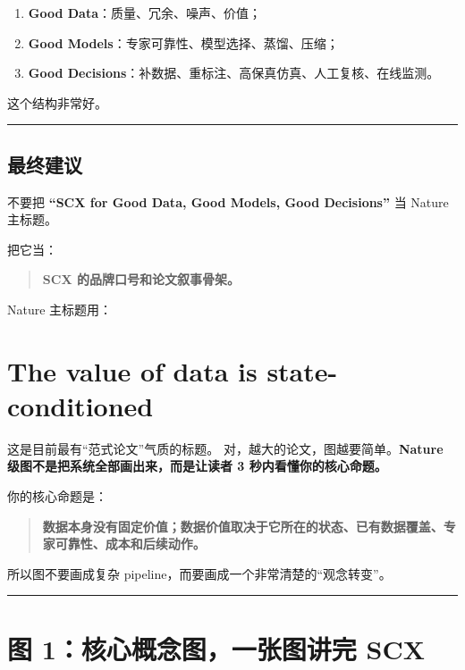 \documentclass[
  12pt,
]{ctexart}
\providecommand{\tightlist}{%
  \setlength{\itemsep}{0pt}\setlength{\parskip}{0pt}}
\begin{document}
\begin{enumerate}
\def\labelenumi{\arabic{enumi}.}
\tightlist
\item
  \textbf{Good Data}：质量、冗余、噪声、价值；
\item
  \textbf{Good Models}：专家可靠性、模型选择、蒸馏、压缩；
\item
  \textbf{Good
  Decisions}：补数据、重标注、高保真仿真、人工复核、在线监测。
\end{enumerate}

这个结构非常好。

\begin{center}\rule{0.5\linewidth}{0.5pt}\end{center}

\subsection{最终建议}\label{ux6700ux7ec8ux5efaux8bae-2}

不要把 \textbf{``SCX for Good Data, Good Models, Good Decisions''} 当
Nature 主标题。

把它当：

\begin{quote}
\textbf{SCX 的品牌口号和论文叙事骨架。}
\end{quote}

Nature 主标题用：

\section{\texorpdfstring{\textbf{The value of data is
state-conditioned}}{The value of data is state-conditioned}}\label{the-value-of-data-is-state-conditioned-1}

这是目前最有``范式论文''气质的标题。
对，越大的论文，图越要简单。\textbf{Nature
级图不是把系统全部画出来，而是让读者 3 秒内看懂你的核心命题。}

你的核心命题是：

\begin{quote}
\textbf{数据本身没有固定价值；数据价值取决于它所在的状态、已有数据覆盖、专家可靠性、成本和后续动作。}
\end{quote}

所以图不要画成复杂 pipeline，而要画成一个非常清楚的``观念转变''。

\begin{center}\rule{0.5\linewidth}{0.5pt}\end{center}

\section{图 1：核心概念图，一张图讲完
SCX}\label{ux56fe-1ux6838ux5fc3ux6982ux5ff5ux56feux4e00ux5f20ux56feux8bb2ux5b8c-scx}
\end{document}
